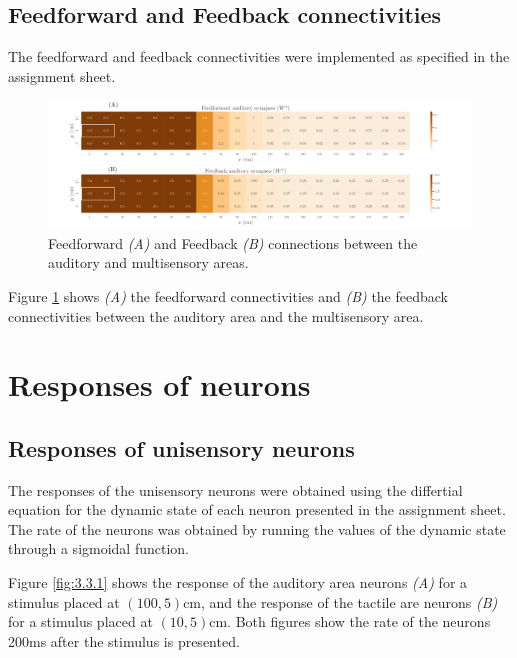 \documentclass[12pt]{article}
\begin{document}
\subsection{Feedforward and Feedback connectivities}

The feedforward and feedback connectivities were implemented as specified in the assignment sheet.

\begin{figure}[h!]
	\centering
	\hspace*{-0.6in}
	\includegraphics[width=1.2\linewidth]{fig/3-2-2.png}
	\caption{Feedforward \textit{(A)} and Feedback \textit{(B)} connections between the auditory and multisensory areas.}
	\label{fig:3.2.2}
\end{figure}

Figure \ref{fig:3.2.2} shows \textit{(A)} the feedforward connectivities and \textit{(B)} the feedback connectivities between the auditory area and the multisensory area.

\section{Responses of neurons}

\subsection{Responses of unisensory neurons}

The responses of the unisensory neurons were obtained using the differtial equation for the dynamic state of each neuron presented in the assignment sheet. The rate of the neurons was obtained by running the values of the dynamic state through a sigmoidal function.

Figure \ref{fig:3.3.1} shows the response of the auditory area neurons \textit{(A)} for a stimulus placed at $(100, 5)$cm, and the response of the tactile are neurons \textit{(B)} for a stimulus placed at $(10, 5)$cm. Both figures show the rate of the neurons 200ms after the stimulus is presented.
\end{document}
